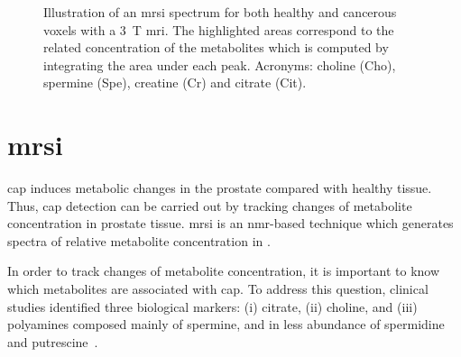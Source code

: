 \begin{figure}
	\centering
	\hspace*{\fill}
	 \hfill
	\hspace*{\fill}
	\caption[Illustration of healthy and cancerous \acs*{mrsi} spectrum.]{Illustration of an \acs*{mrsi} spectrum for both healthy and cancerous voxels with a \SI{3}{\tesla} \acs*{mri}. The highlighted areas correspond to the related concentration of the metabolites which is computed by integrating the area under each peak. Acronyms: choline (Cho), spermine (Spe), creatine (Cr) and citrate (Cit).}
	\label{fig:mrsi}
\end{figure}


\section{\acs*{mrsi}}\label{subsec:chp2:imaging:mrsi}
\ac{cap} induces metabolic changes in the prostate compared with healthy tissue.
Thus, \ac{cap} detection can be carried out by tracking changes of metabolite concentration in prostate tissue.
\ac{mrsi} is an \ac{nmr}-based technique which generates spectra of relative metabolite concentration in .

In order to track changes of metabolite concentration, it is important to know which metabolites are associated with \ac{cap}.
To address this question, clinical studies identified three biological markers: (i) citrate, (ii) choline, and (iii) polyamines composed mainly of spermine, and in less abundance of spermidine and putrescine~\cite{Awwad2012,Costello2006,Giskeodegard2013}. 

